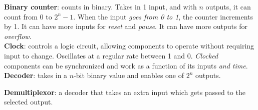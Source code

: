 \documentclass[10pt,landscape]{article}
\begin{document}
\begin{multicols}{3}
\textbf{Binary counter}: counts in binary. Takes in 1 input, and with $n$ outputs, it can count from $0$ to $2^n-1$. When the input \textit{goes from 0 to 1}, the counter increments by 1. It can have more inputs for \textit{reset} and \textit{pause}. It can have more outputs for \textit{overflow}.\\
\textbf{Clock}: controls a logic circuit, allowing components to operate without requiring input to change. Oscillates at a regular rate between 1 and 0. \textit{Clocked} components can be synchronized and work as a function of its inputs \textit{and time}.\\
\textbf{Decoder}: takes in a $n$-bit binary value and enables one of $2^n$ outputs.\\
{\par}
\textbf{Demultiplexor}: a decoder that takes an extra input which gets passed to the selected output. 

\end{multicols}
\end{document}
